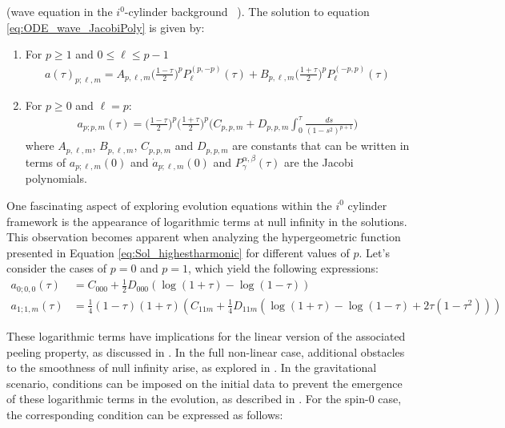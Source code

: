 \begin{lemma} (wave equation in the $i^0$-cylinder
  background~ \cite{MinMacKro22})\label{Lemma:Sol_Jacobi_and_Logs}. The solution to equation \eqref{eq:ODE_wave_JacobiPoly} is given
  by:
	\begin{enumerate}
	\item For $p\geq 1$ and $0\leq \ell \leq p-1$
	 \begin{align}\label{eq:Sol_jac_poly}
    a(\tau)_{p;\ell,m} =A_{p,\ell,m}
		  \bigg(\frac{1-\tau}{2}\bigg)^{p}
                  P_{\ell}^{(p,-p)}(\tau) + B_{p,\ell,m}
                  \bigg(\frac{1+\tau}{2}\bigg)^{p}P_{\ell}^{(-p,p)}(\tau)
	 \end{align}
	
	\item For $p\geq 0$ and $\ell=p$:
     \begin{align}\label{eq:Sol_highestharmonic}
      {a}_{p;p,m}(\tau) =
      \bigg(\frac{1-\tau}{2}\bigg)^{p}\bigg(\frac{1+\tau}{2}\bigg)^{p}\Bigg(C_{p,p,m}
      +D_{p,p,m}\int_{0}^{\tau} \frac{ds}{(1-s^2)^{p+1}}\Bigg)
     \end{align}
	where $A_{p,\ell,m}$, $B_{p,\ell,m}$, $C_{p,p,m}$ and
        $D_{p,p,m}$ are constants that can be written in terms of
        $a_{p;\ell,m}(0)$ and $\dot{a}_{p;\ell,m}(0)$ and
        $P_{\gamma}^{\alpha, \beta}(\tau)$ are the Jacobi polynomials.
    \end{enumerate}
\end{lemma}

One fascinating aspect of exploring evolution equations within the $i^0$ cylinder framework is the appearance of logarithmic terms at null infinity in the solutions. This observation becomes apparent when analyzing the hypergeometric function presented in Equation \eqref{eq:Sol_highestharmonic} for different values of $p$. Let's consider the cases of $p = 0$ and $p = 1$, which yield the following expressions:
\begin{align}
  {a}_{0;0,0}(\tau) & = C_{000} + \tfrac{1}{2} D_{000} (\log(1 + \tau
  )- \log(1 - \tau ))\\ {a}_{1;1,m}(\tau) & = \tfrac{1}{4} (1 - \tau )
  (1 + \tau ) (C_{11m} + \tfrac{1}{4} D_{11m} ( \log(1 + \tau ) -
  \log(1 - \tau ) + 2\tau(1-\tau^2)))
\end{align}

These logarithmic terms have implications for the linear version of the associated peeling property, as discussed in \cite{Val07,MinMacKro22}. In the full non-linear case, additional obstacles to the smoothness of null infinity arise, as explored in \cite{Val04}. In the gravitational scenario, conditions can be imposed on the initial data to prevent the emergence of these logarithmic terms in the evolution, as described in \cite{Fri98a}. For the spin-0 case, the corresponding condition can be expressed as follows:

